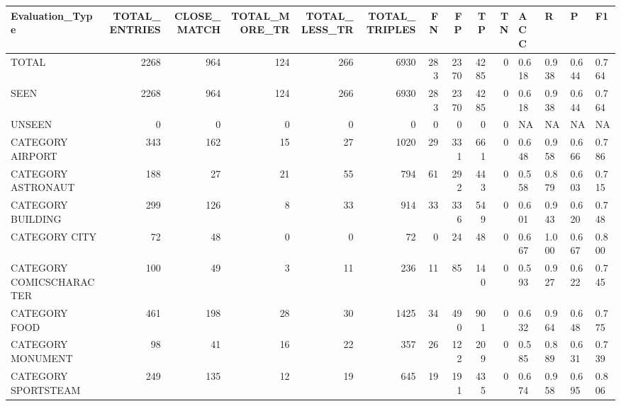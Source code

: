 \begin{tabular}{lrrrrrrrrrllll}
\hline
 Evaluation\_Type          &   TOTAL\_ENTRIES &   CLOSE\_MATCH &   TOTAL\_MORE\_TR &   TOTAL\_LESS\_TR &   TOTAL\_TRIPLES &   FN &   FP &   TP &   TN & ACC   & R     & P     & F1    \\
\hline
 TOTAL                    &            2268 &           964 &             124 &             266 &            6930 &  283 & 2370 & 4285 &    0 & 0.618 & 0.938 & 0.644 & 0.764 \\
 SEEN                     &            2268 &           964 &             124 &             266 &            6930 &  283 & 2370 & 4285 &    0 & 0.618 & 0.938 & 0.644 & 0.764 \\
 UNSEEN                   &               0 &             0 &               0 &               0 &               0 &    0 &    0 &    0 &    0 & NA    & NA    & NA    & NA    \\
 CATEGORY AIRPORT         &             343 &           162 &              15 &              27 &            1020 &   29 &  331 &  661 &    0 & 0.648 & 0.958 & 0.666 & 0.786 \\
 CATEGORY ASTRONAUT       &             188 &            27 &              21 &              55 &             794 &   61 &  292 &  443 &    0 & 0.558 & 0.879 & 0.603 & 0.715 \\
 CATEGORY BUILDING        &             299 &           126 &               8 &              33 &             914 &   33 &  336 &  549 &    0 & 0.601 & 0.943 & 0.620 & 0.748 \\
 CATEGORY CITY            &              72 &            48 &               0 &               0 &              72 &    0 &   24 &   48 &    0 & 0.667 & 1.000 & 0.667 & 0.800 \\
 CATEGORY COMICSCHARACTER &             100 &            49 &               3 &              11 &             236 &   11 &   85 &  140 &    0 & 0.593 & 0.927 & 0.622 & 0.745 \\
 CATEGORY FOOD            &             461 &           198 &              28 &              30 &            1425 &   34 &  490 &  901 &    0 & 0.632 & 0.964 & 0.648 & 0.775 \\
 CATEGORY MONUMENT        &              98 &            41 &              16 &              22 &             357 &   26 &  122 &  209 &    0 & 0.585 & 0.889 & 0.631 & 0.739 \\
 CATEGORY SPORTSTEAM      &             249 &           135 &              12 &              19 &             645 &   19 &  191 &  435 &    0 & 0.674 & 0.958 & 0.695 & 0.806 \\

\end{tabular}
